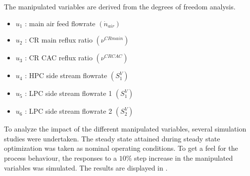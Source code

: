             The manipulated variables are derived from the degrees of freedom analysis.
            \begin{itemize}
                \item $u_1$ : main air feed flowrate $\left(\dot{n}_{air}\right)$
                \item $u_2$ : CR main reflux ratio $\left(\nu^{CR main}\right)$
                \item $u_3$ : CR CAC reflux ratio $\left(\nu^{CR CAC}\right)$
                \item $u_4$ : HPC side stream flowrate $\left(S^V_1\right)$
                \item $u_5$ : LPC side stream flowrate 1 $\left(S^V_1\right)$
                \item $u_6$ : LPC side stream flowrate 2 $\left(S^V_2\right)$
            \end{itemize}

            To analyze the impact of the different manipulated variables, several simulation studies were
            undertaken. The steady state attained during steady state optimization was taken as nominal operating
            conditions. To get a feel for the process behaviour, the responses to a $10 \%$ step increase in
            the manipulated variables was simulated. The results are displayed in .

